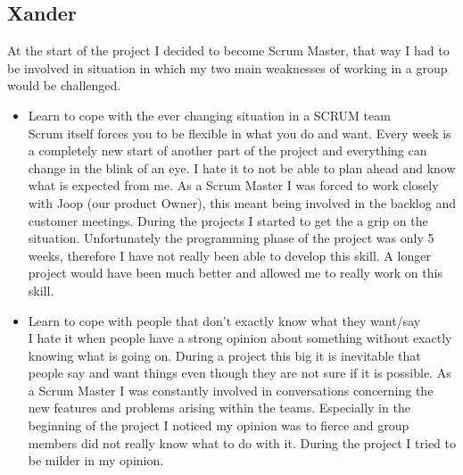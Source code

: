 \documentclass{article}
\begin{document}
\begin{enumerate}
\begin{itemize}
\subsection*{Xander}
At the start of the project I decided to become Scrum Master, that way I had to be involved in situation in which my two main weaknesses of working in a group would be challenged.
\begin{itemize}
	\item Learn to cope with the ever changing situation in a SCRUM team \\
	Scrum itself forces you to be flexible in what you do and want. Every week is a completely new start of another part of the project and everything can change in the blink of an eye. I hate it to not be able to plan ahead and know what is expected from me. As a Scrum Master I was forced to work closely with Joop (our product Owner), this meant being involved in the backlog and customer meetings. During the projects I started to get the a grip on the situation. Unfortunately the programming phase of the project was only 5 weeks, therefore I have not really been able to develop this skill. A longer project would have been much better and allowed me to really work on this skill.
	\item Learn to cope with people that don't exactly know what they want/say \\
	I hate it when people have a strong opinion about something without exactly knowing what is going on. During a project this big it is inevitable that people say and want things even though they are not sure if it is possible. As a Scrum Master I was constantly involved in conversations concerning the new features and problems arising within the teams. Especially in the beginning of the project I noticed my opinion was to fierce and group members did not really know what to do with it. During the project I tried to be milder in my opinion.
\end{itemize}


\end{itemize}
\end{enumerate}
\end{document}
